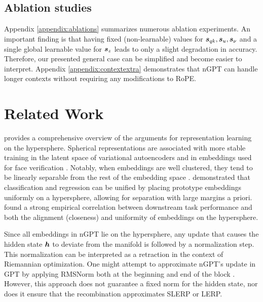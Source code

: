 \documentclass{article} %
\begin{document}
\subsection{Ablation studies}

Appendix \ref{appendix:ablations} summarizes numerous ablation experiments. An important finding is that having fixed (non-learnable) values for ${\bm{s}}_{qk},{\bm{s}}_u,{\bm{s}}_{\nu}$ and a single global learnable value for ${\bm{s}}_z$ leads to only a slight degradation in accuracy. Therefore, our presented general case can be simplified and become easier to interpret. Appendix \ref{appendix:contextextra} demonstrates that nGPT can handle longer contexts 
without requiring any modifications to RoPE. 

\section{Related Work}
\label{section_relatedwork}

\citet{wang2020understanding} provides a comprehensive overview of the arguments for representation learning on the hypersphere. Spherical representations are associated with more stable training in the latent space of variational autoencoders \citep{xu2018spherical} and in embeddings used for face verification \citep{wang2017normface}. Notably, when embeddings are well clustered, they tend to be linearly separable from the rest of the embedding space \citep{wang2020understanding}. \citet{mettes2019hyperspherical} demonstrated that classification and regression can be unified by placing prototype embeddings uniformly on a hypersphere, allowing for separation with large margins a priori. \citet{wang2020understanding} found a strong empirical correlation between downstream task performance and both the alignment (closeness) and uniformity of embeddings on the hypersphere.

Since all embeddings in nGPT lie on the hypersphere, any update that causes the hidden state ${\bm{h}}$ to deviate from the manifold is followed by a normalization step. This normalization can be interpreted as a retraction in the context of Riemannian optimization. One might attempt to approximate nGPT's update in GPT by applying RMSNorm both at the beginning and end of the block \citep{xiong2020layer}. However, this approach does not guarantee a fixed norm for the hidden state, nor does it ensure that the recombination approximates SLERP or LERP. 
\end{document}
